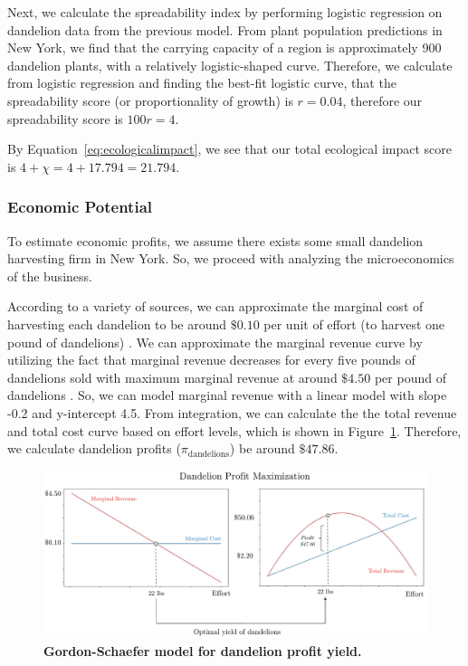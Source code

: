 Next, we calculate the spreadability index by performing logistic regression on dandelion data from the previous model. From plant population predictions in New York, we find that the carrying capacity of a region is approximately 900 dandelion plants, with a relatively logistic-shaped curve. Therefore, we calculate from logistic regression and finding the best-fit logistic curve, that the spreadability score (or proportionality of growth) is \(r = 0.04\), therefore our spreadability score is \(100r = 4\).

By Equation~\ref{eq:ecologicalimpact}, we see that our total ecological impact score is \(4 + \chi = 4 + 17.794 = 21.794\).

\subsubsection{Economic Potential}

To estimate economic profits, we assume there exists some small dandelion harvesting firm in New York. So, we proceed with analyzing the microeconomics of the business.

According to a variety of sources, we can approximate the marginal cost of harvesting each dandelion to be around \(\$0.10\) per unit of effort (to harvest one pound of dandelions) \cite{farmshowGrowingDandelions, gardeningknowhowDandelionHarvest}. We can approximate the marginal revenue curve by utilizing the fact that marginal revenue decreases for every five pounds of dandelions sold with maximum marginal revenue at around \(\$4.50\) per pound of dandelions \cite{farmfitlivingMakeMoney}. So, we can model marginal revenue with a linear model with slope -0.2 and y-intercept 4.5. From integration, we can calculate the the total revenue and total cost curve based on effort levels, which is shown in Figure~\ref{fig:dandelionprofits}. Therefore, we calculate dandelion profits (\(\pi_{\text{dandelions}}\)) be around \(\$47.86\).

\begin{figure}[h!]
\centering
    \includegraphics[scale=0.5]{figures/dandelionprofitmax.pdf}
    \captionsetup{width=0.9\textwidth}
    \caption{\textbf{Gordon-Schaefer model for dandelion profit yield.}}
    \label{fig:dandelionprofits}
\end{figure}

